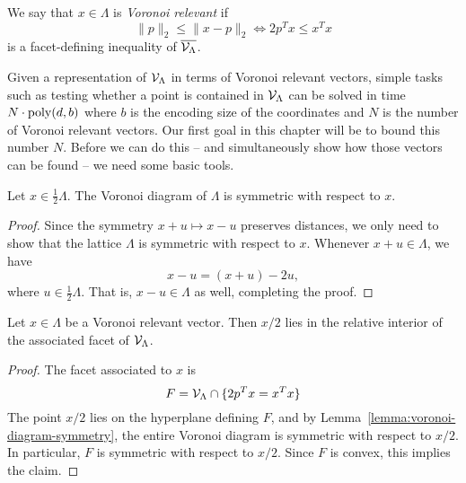 \begin{definition}
  \label{def:voronoi-relevant}
  We say that $x \in \Lambda$ is \emph{Voronoi relevant} if
  \[
    \| p \|_2 \leq \| x - p \|_2 \iff 2p^Tx \leq x^T x
  \]
  is a facet-defining inequality of $\overline{\mathcal{V}_\Lambda}$.
\end{definition}

Given a representation of $\mathcal{V}_\Lambda$ in terms of Voronoi relevant vectors,
simple tasks such as testing whether a point is contained in $\mathcal{V}_\Lambda$
can be solved in time $N \cdot \operatorname{poly}(d, b)$
where $b$ is the encoding size of the coordinates
and $N$ is the number of Voronoi relevant vectors.
Our first goal in this chapter will be to bound this number $N$.
Before we can do this -- and simultaneously show how those vectors
can be found -- we need some basic tools.

\begin{lemma}
  \label{lemma:voronoi-diagram-symmetry}
  Let $x \in \frac{1}{2} \Lambda$.
  The Voronoi diagram of $\Lambda$ is symmetric with respect to $x$.
\end{lemma}
\begin{proof}
  Since the symmetry $x + u \mapsto x - u$ preserves distances,
  we only need to show that the lattice $\Lambda$ is symmetric with respect to $x$.
  Whenever $x + u \in \Lambda$, we have
  \[
    x - u = (x + u) - 2u,
  \]
  where $u \in \frac{1}{2} \Lambda$.
  That is, $x - u \in \Lambda$ as well, completing the proof.
\end{proof}

\begin{lemma}
  \label{lemma:voronoi-relevant-facet-interior}
  Let $x \in \Lambda$ be a Voronoi relevant vector.
  Then $x/2$ lies in the relative interior of the associated facet of $\mathcal{V}_\Lambda$.
\end{lemma}
\begin{proof}
  The facet associated to $x$ is
  \[
    F = \mathcal{V}_\Lambda \cap \{ 2p^Tx = x^Tx \}
  \]
  The point $x/2$ lies on the hyperplane defining $F$,
  and by Lemma~\ref{lemma:voronoi-diagram-symmetry},
  the entire Voronoi diagram is symmetric with respect to $x/2$.
  In particular, $F$ is symmetric with respect to $x/2$.
  Since $F$ is convex, this implies the claim.
\end{proof}

